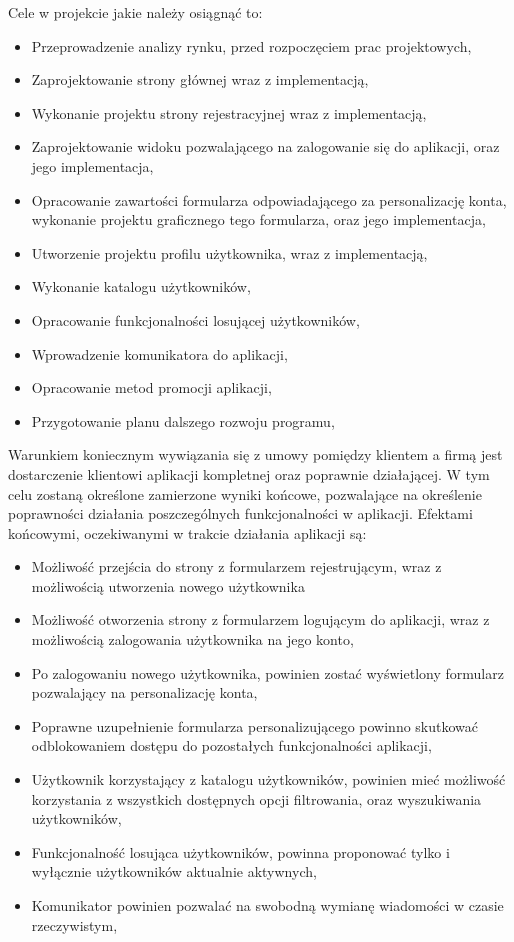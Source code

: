 \documentclass[12pt,a4paper]{article}
\begin{document}
Cele w projekcie jakie należy osiągnąć to: 
\begin{itemize}
    \item Przeprowadzenie analizy rynku, przed rozpoczęciem prac projektowych, 
    \item Zaprojektowanie strony głównej wraz z implementacją,
    \item Wykonanie projektu strony rejestracyjnej wraz z implementacją, 
    \item Zaprojektowanie widoku pozwalającego na zalogowanie się do aplikacji, oraz jego implementacja,
    \item Opracowanie zawartości formularza odpowiadającego za personalizację konta, wykonanie projektu graficznego tego formularza, oraz jego implementacja,
    \item Utworzenie projektu profilu użytkownika, wraz z implementacją, 
    \item Wykonanie katalogu użytkowników, 
    \item Opracowanie funkcjonalności losującej użytkowników, 
    \item Wprowadzenie komunikatora do aplikacji,
    \item Opracowanie metod promocji aplikacji, 
    \item Przygotowanie planu dalszego rozwoju programu, 
\end{itemize}

Warunkiem koniecznym wywiązania się z umowy pomiędzy klientem a firmą jest dostarczenie klientowi aplikacji kompletnej oraz poprawnie działającej. W tym celu zostaną określone zamierzone wyniki końcowe, pozwalające na określenie poprawności działania poszczególnych funkcjonalności w aplikacji. Efektami końcowymi, oczekiwanymi w trakcie działania aplikacji są: 
\begin{itemize}
    \item Możliwość przejścia do strony z formularzem rejestrującym, wraz z możliwością utworzenia nowego użytkownika
    \item Możliwość otworzenia strony z formularzem logującym do aplikacji, wraz z możliwością zalogowania użytkownika na jego konto,
    \item Po zalogowaniu nowego użytkownika, powinien zostać wyświetlony formularz pozwalający na personalizację konta, 
    \item Poprawne uzupełnienie formularza personalizującego powinno skutkować odblokowaniem dostępu do pozostałych funkcjonalności aplikacji,
    \item Użytkownik korzystający z katalogu użytkowników, powinien mieć możliwość korzystania z wszystkich dostępnych opcji filtrowania, oraz wyszukiwania użytkowników, 
    \item Funkcjonalność losująca użytkowników, powinna proponować tylko i wyłącznie użytkowników aktualnie aktywnych, 
    \item Komunikator powinien pozwalać na swobodną wymianę wiadomości w czasie rzeczywistym,
\end{itemize}
\end{document}
